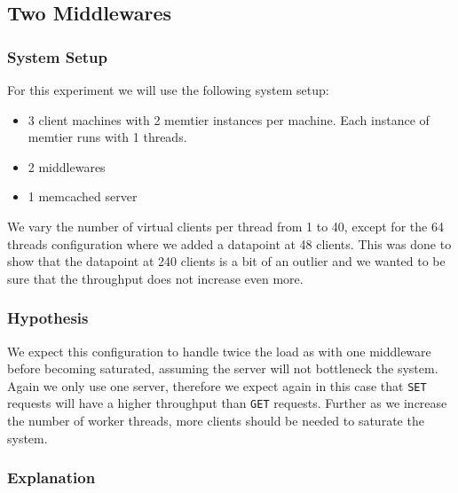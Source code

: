 \documentclass[11pt,a4paper]{article}
\begin{document}
\subsection{Two Middlewares}
%
\subsubsection{System Setup}
%
For this experiment we will use the following system setup:
%
\begin{itemize}
	\item 3 client machines with 2 memtier instances per machine. Each instance of memtier runs with 1 threads.
	\item 2 middlewares
	\item 1 memcached server
\end{itemize}
%
We vary the number of virtual clients per thread from 1 to 40, except for the 64 threads configuration where we added a datapoint at 48 clients.
%
This was done to show that the datapoint at 240 clients is a bit of an outlier and we wanted to be sure that the throughput does not increase even more.
%
\subsubsection{Hypothesis}
%
We expect this configuration to handle twice the load as with one middleware before becoming saturated, assuming the server will not bottleneck the system.
%
Again we only use one server, therefore we expect again in this case that \texttt{SET} requests will have a higher throughput than \texttt{GET} requests.
%
Further as we increase the number of worker threads, more clients should be needed to saturate the system.
%
\subsubsection{Explanation}\label{subsec:two_middlewares_explanation}
%
\end{document}
